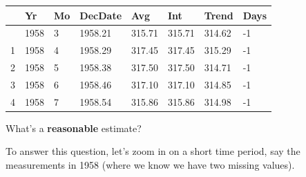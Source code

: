 \documentclass[
  letterpaper,
  DIV=11,
  numbers=noendperiod]{scrreprt}
\begin{document}
\begin{longtable}[]{@{}llllllll@{}}
\toprule\noalign{}
& Yr & Mo & DecDate & Avg & Int & Trend & Days \\
\midrule\noalign{}
\endhead
\bottomrule\noalign{}
\endlastfoot
0 & 1958 & 3 & 1958.21 & 315.71 & 315.71 & 314.62 & -1 \\
1 & 1958 & 4 & 1958.29 & 317.45 & 317.45 & 315.29 & -1 \\
2 & 1958 & 5 & 1958.38 & 317.50 & 317.50 & 314.71 & -1 \\
3 & 1958 & 6 & 1958.46 & 317.10 & 317.10 & 314.85 & -1 \\
4 & 1958 & 7 & 1958.54 & 315.86 & 315.86 & 314.98 & -1 \\
\end{longtable}

What's a \textbf{reasonable} estimate?

To answer this question, let's zoom in on a short time period, say the
measurements in 1958 (where we know we have two missing values).
\end{document}
